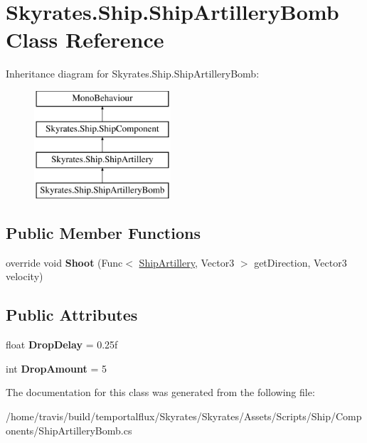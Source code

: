 \hypertarget{class_skyrates_1_1_ship_1_1_ship_artillery_bomb}{\section{Skyrates.\-Ship.\-Ship\-Artillery\-Bomb Class Reference}
\label{class_skyrates_1_1_ship_1_1_ship_artillery_bomb}
}
Inheritance diagram for Skyrates.\-Ship.\-Ship\-Artillery\-Bomb\-:\begin{figure}[H]
\begin{center}
\leavevmode
\includegraphics[height=4.000000cm]{class_skyrates_1_1_ship_1_1_ship_artillery_bomb}
\end{center}
\end{figure}
\subsection*{Public Member Functions}
\begin{DoxyCompactItemize}
\item 
\hypertarget{class_skyrates_1_1_ship_1_1_ship_artillery_bomb_afd6c8b49dfc43b32667fe4df5f9e82a5}{override void {\bfseries Shoot} (Func$<$ \hyperlink{class_skyrates_1_1_ship_1_1_ship_artillery}{Ship\-Artillery}, Vector3 $>$ get\-Direction, Vector3 velocity)}\label{class_skyrates_1_1_ship_1_1_ship_artillery_bomb_afd6c8b49dfc43b32667fe4df5f9e82a5}

\end{DoxyCompactItemize}
\subsection*{Public Attributes}
\begin{DoxyCompactItemize}
\item 
\hypertarget{class_skyrates_1_1_ship_1_1_ship_artillery_bomb_a744662e01171fd1c1a598ae0dca7786f}{float {\bfseries Drop\-Delay} = 0.\-25f}\label{class_skyrates_1_1_ship_1_1_ship_artillery_bomb_a744662e01171fd1c1a598ae0dca7786f}

\item 
\hypertarget{class_skyrates_1_1_ship_1_1_ship_artillery_bomb_aa4447efb191469f45266ed05fab19c4c}{int {\bfseries Drop\-Amount} = 5}\label{class_skyrates_1_1_ship_1_1_ship_artillery_bomb_aa4447efb191469f45266ed05fab19c4c}

\end{DoxyCompactItemize}


The documentation for this class was generated from the following file\-:\begin{DoxyCompactItemize}
\item 
/home/travis/build/temportalflux/\-Skyrates/\-Skyrates/\-Assets/\-Scripts/\-Ship/\-Components/Ship\-Artillery\-Bomb.\-cs\end{DoxyCompactItemize}
